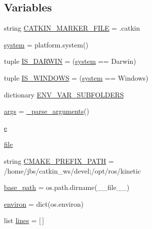 \subsection*{Variables}
\begin{DoxyCompactItemize}
\item 
string \hyperlink{namespace__setup__util_a3fa0ca5a460a71a43cbc3d4954ab1f10}{C\+A\+T\+K\+I\+N\+\_\+\+M\+A\+R\+K\+E\+R\+\_\+\+F\+I\+LE} = \textquotesingle{}.catkin\textquotesingle{}
\item 
\hyperlink{namespace__setup__util_ae9fca6a80a6923f4580be72f68fee325}{system} = platform.\+system()
\item 
tuple \hyperlink{namespace__setup__util_aecbb100ce6f94bb3c7e16d58fde05f96}{I\+S\+\_\+\+D\+A\+R\+W\+IN} = (\hyperlink{namespace__setup__util_ae9fca6a80a6923f4580be72f68fee325}{system} == \textquotesingle{}Darwin\textquotesingle{})
\item 
tuple \hyperlink{namespace__setup__util_a6fe69c2dbd92959b6651a28cbb846e6e}{I\+S\+\_\+\+W\+I\+N\+D\+O\+WS} = (\hyperlink{namespace__setup__util_ae9fca6a80a6923f4580be72f68fee325}{system} == \textquotesingle{}Windows\textquotesingle{})
\item 
dictionary \hyperlink{namespace__setup__util_aa31804f1be8660156ce9394b33c68dc4}{E\+N\+V\+\_\+\+V\+A\+R\+\_\+\+S\+U\+B\+F\+O\+L\+D\+E\+RS}
\item 
\hyperlink{namespace__setup__util_a547963d07c6371df1c51b1384a2dec28}{args} = \hyperlink{namespace__setup__util_a57d9ecb280810c9a5409d44aeb9d0a25}{\+\_\+parse\+\_\+arguments}()
\item 
\hyperlink{namespace__setup__util_acdce690b925de33d6249bbbfa1109d61}{e}
\item 
\hyperlink{namespace__setup__util_aea63a1b32cc79bc3d872ab7cb30dd07e}{file}
\item 
string \hyperlink{namespace__setup__util_a57afd3d2c076955fb715f3e72ef098eb}{C\+M\+A\+K\+E\+\_\+\+P\+R\+E\+F\+I\+X\+\_\+\+P\+A\+TH} = \textquotesingle{}/home/jbs/catkin\+\_\+ws/devel;/opt/ros/kinetic\textquotesingle{}
\item 
\hyperlink{namespace__setup__util_a83d25140acd7788bbcb95843fe38e639}{base\+\_\+path} = os.\+path.\+dirname(\+\_\+\+\_\+file\+\_\+\+\_\+)
\item 
\hyperlink{namespace__setup__util_a9a935bdd9ee1aa0327161025bb18c136}{environ} = dict(os.\+environ)
\item 
list \hyperlink{namespace__setup__util_a8618d8be5f729d4c9696daa5e083a001}{lines} = \mbox{[}$\,$\mbox{]}
\end{DoxyCompactItemize}


